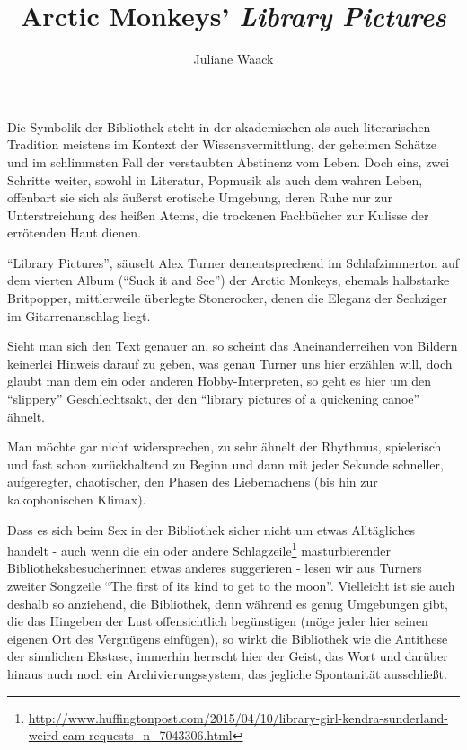 \documentclass[a4paper,
fontsize=11pt,
oneside,
numbers=noperiodatend,
parskip=half-,
bibliography=totoc,
final
]{scrartcl}
\title{\LARGE{Arctic Monkeys’ \emph{Library Pictures}}} %
\author{Juliane Waack} %
\date{}
\begin{document}
\maketitle
\thispagestyle{fancyplain} 


Die Symbolik der Bibliothek steht in der akademischen als auch
literarischen Tradition meistens im Kontext der Wissensvermittlung, der
geheimen Schätze und im schlimmsten Fall der verstaubten Abstinenz vom
Leben. Doch eins, zwei Schritte weiter, sowohl in Literatur, Popmusik
als auch dem wahren Leben, offenbart sie sich als äußerst erotische
Umgebung, deren Ruhe nur zur Unterstreichung des heißen Atems, die
trockenen Fachbücher zur Kulisse der errötenden Haut dienen.

\enquote{Library Pictures}, säuselt Alex Turner dementsprechend im
Schlafzimmerton auf dem vierten Album (\enquote{Suck it and See}) der
Arctic Monkeys, ehemals halbstarke Britpopper, mittlerweile überlegte
Stonerocker, denen die Eleganz der Sechziger im Gitarrenanschlag liegt.

Sieht man sich den Text genauer an, so scheint das Aneinanderreihen von
Bildern keinerlei Hinweis darauf zu geben, was genau Turner uns hier
erzählen will, doch glaubt man dem ein oder anderen Hobby-Interpreten,
so geht es hier um den \enquote{slippery} Geschlechtsakt, der den
\enquote{library pictures of a quickening canoe} ähnelt.

Man möchte gar nicht widersprechen, zu sehr ähnelt der Rhythmus,
spielerisch und fast schon zurückhaltend zu Beginn und dann mit jeder
Sekunde schneller, aufgeregter, chaotischer, den Phasen des Liebemachens
(bis hin zur kakophonischen Klimax).

Dass es sich beim Sex in der Bibliothek sicher nicht um etwas
Alltägliches handelt - auch wenn die ein oder andere
Schlagzeile\footnote{\url{http://www.huffingtonpost.com/2015/04/10/library-girl-kendra-sunderland-weird-cam-requests_n_7043306.html}}
masturbierender Bibliotheksbesucherinnen etwas anderes suggerieren -
lesen wir aus Turners zweiter Songzeile \enquote{The first of its kind
to get to the moon}. Vielleicht ist sie auch deshalb so anziehend, die
Bibliothek, denn während es genug Umgebungen gibt, die das Hingeben der
Lust offensichtlich begünstigen (möge jeder hier seinen eigenen Ort des
Vergnügens einfügen), so wirkt die Bibliothek wie die Antithese der
sinnlichen Ekstase, immerhin herrscht hier der Geist, das Wort und
darüber hinaus auch noch ein Archivierungssystem, das jegliche
Spontanität ausschließt.
\end{document}
